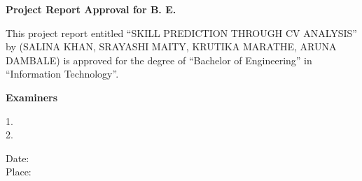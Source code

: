 \begin{center}
	
	
	\vspace*{3cm}
	\textbf{\Large Project Report Approval for B. E.} \\[2em]
\end{center}

This project report entitled “SKILL PREDICTION THROUGH CV ANALYSIS” by (SALINA KHAN, SRAYASHI MAITY, KRUTIKA MARATHE, ARUNA DAMBALE) is approved for the degree of “Bachelor of Engineering” in “Information Technology”. \\

\vspace{8em}
\begin{center}
\textbf{Examiners} \\[1cm]
\end{center}
\begin{flushright}
	
	1.\ \underline{\hspace{8cm}} \\[2cm]
	2.\ \underline{\hspace{8cm}}
\end{flushright}
\vspace{4em}
Date: 
\vspace{2em} \\
Place: